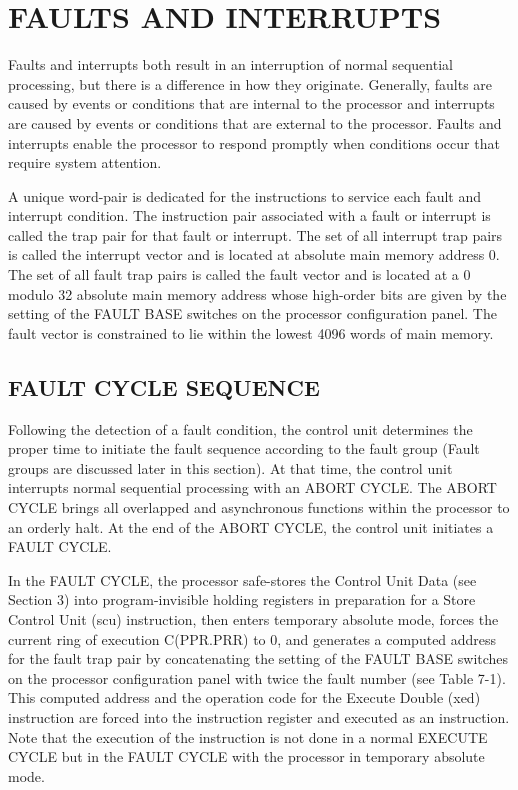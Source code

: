 
\section{FAULTS AND INTERRUPTS}

Faults and interrupts both result in an interruption of normal sequential
processing, but there is a difference in how they originate. Generally, faults
are caused by events or conditions that are internal to the processor and
interrupts are caused by events or conditions that are external to the
processor. Faults and interrupts enable the processor to respond promptly when
conditions occur that require system attention.


A unique word-pair is dedicated for the instructions to service each fault and
interrupt condition. The instruction pair associated with a fault or interrupt
is called the trap pair for that fault or interrupt. The set of all interrupt
trap pairs is called the interrupt vector and is located at absolute main
memory address 0. The set of all fault trap pairs is called the fault vector
and is located at a 0 modulo 32 absolute main memory address whose high-order
bits are given by the setting of the FAULT BASE switches on the processor
configuration panel. The fault vector is constrained to lie within the lowest
4096 words of main memory.


\subsection{FAULT CYCLE SEQUENCE}

Following the detection of a fault condition, the control unit determines the
proper time to initiate the fault sequence according to the fault group (Fault
groups are discussed later in this section). At that time, the control unit
interrupts normal sequential processing with an ABORT CYCLE.  The ABORT CYCLE
brings all overlapped and asynchronous functions within the processor to an
orderly halt. At the end of the ABORT CYCLE, the control unit initiates a FAULT
CYCLE.


In the FAULT CYCLE, the processor safe-stores the Control Unit Data (see
Section 3) into program-invisible holding registers in preparation for a Store
Control Unit (scu) instruction, then enters temporary absolute mode, forces the
current ring of execution C(PPR.PRR) to 0, and generates a computed address for
the fault trap pair by concatenating the setting of the FAULT BASE switches on
the processor configuration panel with twice the fault number (see Table 7-1).
This computed address and the operation code for the Execute Double (xed)
instruction are forced into the instruction register and executed as an
instruction. Note that the execution of the instruction is not done in a normal
EXECUTE CYCLE but in the FAULT CYCLE with the processor in temporary absolute
mode.

